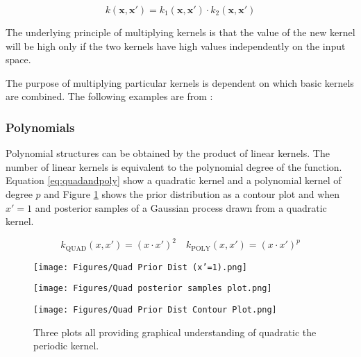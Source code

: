\documentclass[12pt,a4paper]{article}
\begin{document}
\begin{equation}
k(\bm{\mathbf{x}},\bm{\mathbf{x'}}) = k_1(\bm{\mathbf{x}},\bm{\mathbf{x'}}) \cdot k_2(\bm{\mathbf{x}},\bm{\mathbf{x'}})
\label{eq:productkernel}
\end{equation}

The underlying principle of multiplying kernels is that the value of the new kernel will be high only if the two kernels have high values independently on the input space.

The purpose of multiplying particular kernels is dependent on which basic kernels are combined. The following examples are from \citet{duvenaud2014automatic}:

\subsubsection{Polynomials}

Polynomial structures can be obtained by the product of linear kernels. The number of linear kernels is equivalent to the polynomial degree of the function. Equation \eqref{eq:quadandpoly} show a quadratic kernel and a polynomial kernel of degree \(p\) and Figure \ref{fig:Quad plots} shows the prior distribution as a contour plot and when \(x'=1\) and posterior samples of a Gaussian process drawn from a quadratic kernel.

\begin{equation}
k_\text{QUAD}(x, x') = (x \cdot x')^2 \quad k_\text{POLY}(x, x') = (x \cdot x')^p
\label{eq:quadandpoly}
\end{equation}

\begin{figure}[h]
    \centering

    \begin{minipage}{0.45\textwidth}
        \centering
        \texttt{[image: Figures/Quad Prior Dist (x'=1).png]} %
        \label{fig:Quad Prior Dist (x'=1)}
    \end{minipage} 
    \begin{minipage}{0.45\textwidth}
        \centering
        \texttt{[image: Figures/Quad posterior samples plot.png]} %
        \label{fig:Quad posterior samples plot}
    \end{minipage}
    \begin{minipage}{0.45\textwidth}
        \centering
        \texttt{[image: Figures/Quad Prior Dist Contour Plot.png]} %
        \label{fig:Quad Prior Dist Contour Plot}
    \end{minipage}
    \caption{Three plots all providing graphical understanding of quadratic the periodic kernel.}
    \label{fig:Quad plots}
\end{figure}
\end{document}
